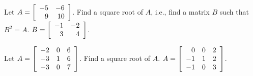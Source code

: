 \documentclass{ximera}
\begin{document}
\begin{example}
  Let $A = \startmat{rr}
    -5 & -6 \\
    9 & 10 \\
  \stopmat$. Find a square root of $A$, i.e., find a matrix $B$
  such that $B^2=A$.
  $B=\startmat{rr}
    -1 & -2 \\
    3  & 4 \\
  \stopmat$.
\end{example}

\begin{example}
  Let $A = \startmat{rrr}
    -2 & 0 & 6 \\
    -3 & 1 & 6 \\
    -3 & 0 & 7 \\
  \stopmat$. Find a square root of $A$.
  $A = \startmat{rrr}
    0  &  0 & 2 \\
    -1 &  1 & 2 \\
    -1 &  0 & 3 \\
  \stopmat$.
\end{example}
\end{document}
